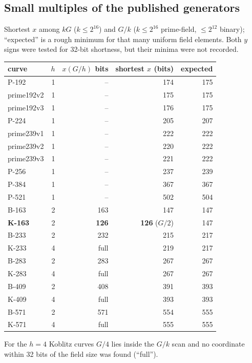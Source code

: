 \subsection{Small multiples of the published generators}
Shortest $x$ among $kG$ ($k\le2^{16}$) and $G/k$ ($k\le2^{16}$ prime-field, $\le2^{12}$ binary); ``expected'' is a rough minimum for that many uniform field elements. Both $y$ signs were tested for 32-bit shortness, but their minima were not recorded.
\begin{center}\small
\begin{tabular}{lrrrr}
\toprule
curve & $h$ & $x(G/h)$ bits & shortest $x$ (bits) & expected \\
\midrule
P-192 & 1 & -- & 174 & 175 \\ prime192v2 & 1 & -- & 175 & 175 \\ prime192v3 & 1 & -- & 176 & 175 \\
P-224 & 1 & -- & 205 & 207 \\ prime239v1 & 1 & -- & 222 & 222 \\ prime239v2 & 1 & -- & 220 & 222 \\ prime239v3 & 1 & -- & 221 & 222 \\
P-256 & 1 & -- & 237 & 239 \\ P-384 & 1 & -- & 367 & 367 \\ P-521 & 1 & -- & 502 & 504 \\
\midrule
B-163 & 2 & 163 & 147 & 147 \\ \textbf{K-163} & 2 & \textbf{126} & \textbf{126} ($G/2$) & 147 \\
B-233 & 2 & 232 & 215 & 217 \\ K-233 & 4 & full & 219 & 217 \\
B-283 & 2 & 283 & 267 & 267 \\ K-283 & 4 & full & 267 & 267 \\
B-409 & 2 & 408 & 391 & 393 \\ K-409 & 4 & full & 393 & 393 \\
B-571 & 2 & 571 & 554 & 555 \\ K-571 & 4 & full & 555 & 555 \\
\bottomrule
\end{tabular}
\end{center}
For the $h=4$ Koblitz curves $G/4$ lies inside the $G/k$ scan and no coordinate within 32 bits of the field size was found (``full'').
